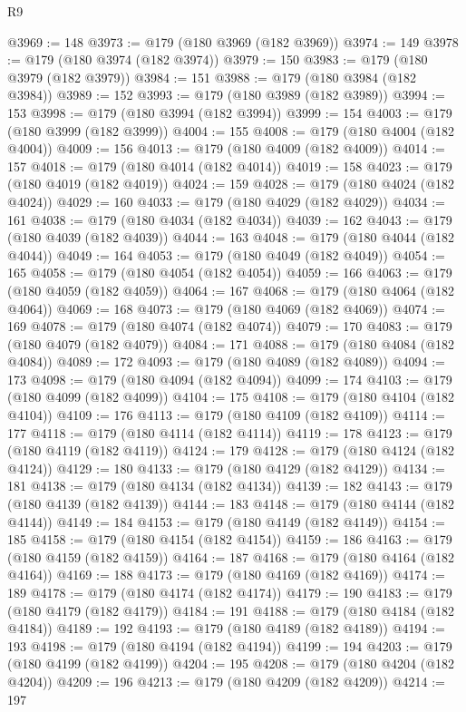 \begin{lexlean}{R9}
\begin{coremodule}
@3969 := 148
@3973 := @179 (@180 @3969 (@182 @3969))
@3974 := 149
@3978 := @179 (@180 @3974 (@182 @3974))
@3979 := 150
@3983 := @179 (@180 @3979 (@182 @3979))
@3984 := 151
@3988 := @179 (@180 @3984 (@182 @3984))
@3989 := 152
@3993 := @179 (@180 @3989 (@182 @3989))
@3994 := 153
@3998 := @179 (@180 @3994 (@182 @3994))
@3999 := 154
@4003 := @179 (@180 @3999 (@182 @3999))
@4004 := 155
@4008 := @179 (@180 @4004 (@182 @4004))
@4009 := 156
@4013 := @179 (@180 @4009 (@182 @4009))
@4014 := 157
@4018 := @179 (@180 @4014 (@182 @4014))
@4019 := 158
@4023 := @179 (@180 @4019 (@182 @4019))
@4024 := 159
@4028 := @179 (@180 @4024 (@182 @4024))
@4029 := 160
@4033 := @179 (@180 @4029 (@182 @4029))
@4034 := 161
@4038 := @179 (@180 @4034 (@182 @4034))
@4039 := 162
@4043 := @179 (@180 @4039 (@182 @4039))
@4044 := 163
@4048 := @179 (@180 @4044 (@182 @4044))
@4049 := 164
@4053 := @179 (@180 @4049 (@182 @4049))
@4054 := 165
@4058 := @179 (@180 @4054 (@182 @4054))
@4059 := 166
@4063 := @179 (@180 @4059 (@182 @4059))
@4064 := 167
@4068 := @179 (@180 @4064 (@182 @4064))
@4069 := 168
@4073 := @179 (@180 @4069 (@182 @4069))
@4074 := 169
@4078 := @179 (@180 @4074 (@182 @4074))
@4079 := 170
@4083 := @179 (@180 @4079 (@182 @4079))
@4084 := 171
@4088 := @179 (@180 @4084 (@182 @4084))
@4089 := 172
@4093 := @179 (@180 @4089 (@182 @4089))
@4094 := 173
@4098 := @179 (@180 @4094 (@182 @4094))
@4099 := 174
@4103 := @179 (@180 @4099 (@182 @4099))
@4104 := 175
@4108 := @179 (@180 @4104 (@182 @4104))
@4109 := 176
@4113 := @179 (@180 @4109 (@182 @4109))
@4114 := 177
@4118 := @179 (@180 @4114 (@182 @4114))
@4119 := 178
@4123 := @179 (@180 @4119 (@182 @4119))
@4124 := 179
@4128 := @179 (@180 @4124 (@182 @4124))
@4129 := 180
@4133 := @179 (@180 @4129 (@182 @4129))
@4134 := 181
@4138 := @179 (@180 @4134 (@182 @4134))
@4139 := 182
@4143 := @179 (@180 @4139 (@182 @4139))
@4144 := 183
@4148 := @179 (@180 @4144 (@182 @4144))
@4149 := 184
@4153 := @179 (@180 @4149 (@182 @4149))
@4154 := 185
@4158 := @179 (@180 @4154 (@182 @4154))
@4159 := 186
@4163 := @179 (@180 @4159 (@182 @4159))
@4164 := 187
@4168 := @179 (@180 @4164 (@182 @4164))
@4169 := 188
@4173 := @179 (@180 @4169 (@182 @4169))
@4174 := 189
@4178 := @179 (@180 @4174 (@182 @4174))
@4179 := 190
@4183 := @179 (@180 @4179 (@182 @4179))
@4184 := 191
@4188 := @179 (@180 @4184 (@182 @4184))
@4189 := 192
@4193 := @179 (@180 @4189 (@182 @4189))
@4194 := 193
@4198 := @179 (@180 @4194 (@182 @4194))
@4199 := 194
@4203 := @179 (@180 @4199 (@182 @4199))
@4204 := 195
@4208 := @179 (@180 @4204 (@182 @4204))
@4209 := 196
@4213 := @179 (@180 @4209 (@182 @4209))
@4214 := 197

\end{coremodule}
\end{lexlean}
